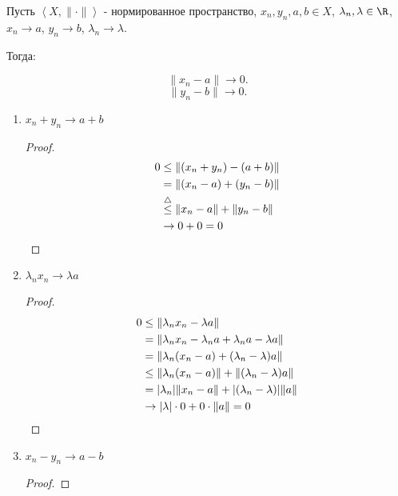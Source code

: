 
\begin{theorem} \thmslashn

    Пусть $\left<X, \|\cdot \|\right>$ - нормированное пространство, $x_{n}, y_{n}, a, b\in X$, $\lambda_{n}, \lambda\in \R$, $x_{n} \to a$, $y_{n} \to b$, $\lambda_{n} \to \lambda$.

    Тогда:

    \[ \|x_{n} - a\| \to 0. \]
    \[ \|y_{n} - b\| \to 0. \]

    \begin{enumerate}
        \item $x_{n} + y_{n} \to a + b$ 
            \begin{proof} \thmslashn
            
                \begin{equation*}
                    \begin{split}
                        0 
                        &\le \|(x_{n} + y_{n}) - (a + b)\|\\
                        &= \|(x_{n} - a) + (y_{n} - b)\|\\
                        &\overset{\triangle}{\le} \|x_{n} - a\| + \|y_{n} - b\|\\
                        &\to 0 + 0 = 0 \qedhere
                    \end{split}
                \end{equation*}
            \end{proof}
        \item $\lambda_{n}x_{n} \to \lambda a$ 
            \begin{proof} \thmslashn
            
                \begin{equation*}
                    \begin{split}
                        0 
                        &\le \|\lambda_{n} x_{n} - \lambda a\|\\
                        &= \|\lambda_{n} x_{n} - \lambda_{n} a + \lambda_{n} a - \lambda a\|\\
                        &= \|\lambda_{n}(x_{n} - a) + (\lambda_{n} - \lambda) a\|\\
                        &\le \|\lambda_{n}(x_{n} - a)\| + \|(\lambda_{n} - \lambda) a\|\\
                        &= |\lambda_{n}| \|x_{n} - a\| + |(\lambda_{n} - \lambda)| \|a\|\\
                        &\to |\lambda| \cdot 0 + 0 \cdot \|a\| = 0 \qedhere
                    \end{split}
                \end{equation*}
            \end{proof}
        \item $x_{n} - y_{n} \to a - b$ 
            \begin{proof} \thmslashn
            

\end{proof}
\end{enumerate}
\end{theorem}
